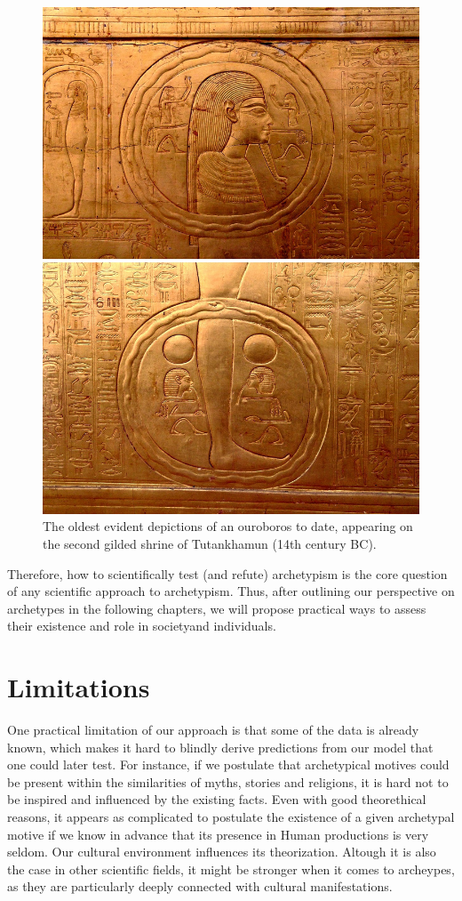 \documentclass[]{book}
\begin{document}
\begin{figure}

{\centering \includegraphics[width=0.49\linewidth]{img/ouroboros_tutankhumon} 

}

\caption{The oldest evident depictions of an ouroboros to date, appearing on the second gilded shrine of Tutankhamun (14th century BC).}\label{fig:unnamed-chunk-8}
\end{figure}

Therefore, how to scientifically test (and refute) archetypism is the core question of any scientific approach to archetypism. Thus, after outlining our perspective on archetypes in the following chapters, we will propose practical ways to assess their existence and role in societyand individuals.

\hypertarget{limitations}{%
\section{Limitations}\label{limitations}}

One practical limitation of our approach is that some of the data is already known, which makes it hard to blindly derive predictions from our model that one could later test. For instance, if we postulate that archetypical motives could be present within the similarities of myths, stories and religions, it is hard not to be inspired and influenced by the existing facts. Even with good theorethical reasons, it appears as complicated to postulate the existence of a given archetypal motive if we know in advance that its presence in Human productions is very seldom. Our cultural environment influences its theorization. Altough it is also the case in other scientific fields, it might be stronger when it comes to archeypes, as they are particularly deeply connected with cultural manifestations.
\end{document}
